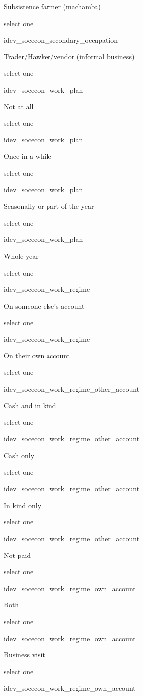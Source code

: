 \documentclass[]{article}
\begin{document}
Subsistence farmer (machamba)

select one

idev\_socecon\_secondary\_occupation

Trader/Hawker/vendor (informal business)

select one

idev\_socecon\_work\_plan

Not at all

select one

idev\_socecon\_work\_plan

Once in a while

select one

idev\_socecon\_work\_plan

Seasonally or part of the year

select one

idev\_socecon\_work\_plan

Whole year

select one

idev\_socecon\_work\_regime

On someone else's account

select one

idev\_socecon\_work\_regime

On their own account

select one

idev\_socecon\_work\_regime\_other\_account

Cash and in kind

select one

idev\_socecon\_work\_regime\_other\_account

Cash only

select one

idev\_socecon\_work\_regime\_other\_account

In kind only

select one

idev\_socecon\_work\_regime\_other\_account

Not paid

select one

idev\_socecon\_work\_regime\_own\_account

Both

select one

idev\_socecon\_work\_regime\_own\_account

Business visit

select one

idev\_socecon\_work\_regime\_own\_account
\end{document}
